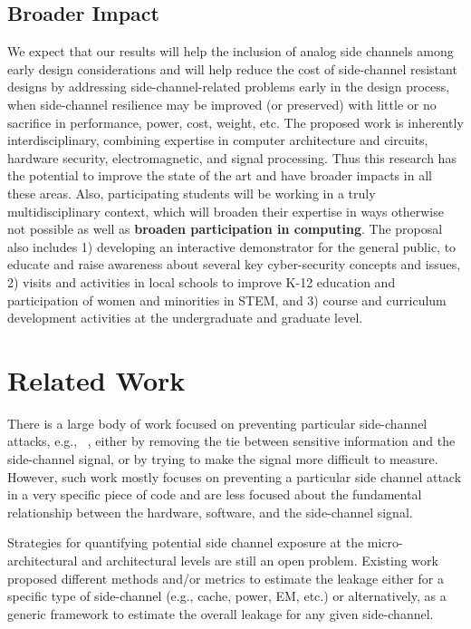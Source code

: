 \documentclass[11 pt]{article}
\begin{document}
\subsection{Broader Impact}
We expect that our results will help the inclusion of analog side channels among early design considerations and will help reduce the cost of side-channel resistant designs by addressing side-channel-related problems early in the design process, when side-channel resilience may be improved (or preserved) with little or no sacrifice in performance, power, cost, weight, etc. The proposed work is inherently interdisciplinary, combining expertise in computer architecture and circuits, hardware security, electromagnetic, and signal processing. Thus this research has the potential to improve the state of the art and have broader impacts in all these areas. Also, participating students will be working in a truly multidisciplinary context, which will broaden their expertise in ways otherwise not possible as well as {\bf broaden participation in computing}. The proposal also includes 1) developing an interactive demonstrator for the general public, to educate and raise awareness about several key cyber-security concepts and issues, 2) visits and activities in local schools to improve K-12 education and participation of women and minorities in STEM, and 3) course and curriculum development activities at the undergraduate and graduate level.
\section{Related Work}
There is a large body of work focused on preventing particular side-channel attacks, e.g., ~\cite{Backes:2010:ASA:1929820.1929847,Nazari:2017:EED:3079856.3080223,Demme:2013:FOM:2485922.2485970,Han:2017:WMB:3133956.3134081,Liu:2016:CET:2976749.2978299,6987331,He:2017:SYC:3123939.3124546,217605,Monjur21}, either by removing the tie between sensitive information and the side-channel signal, or by
trying to make the signal more difficult to measure. However, such work mostly focuses on preventing a particular side
channel attack in a very specific piece of code and are less focused about the fundamental relationship between the hardware, software, and the side-channel signal.

Strategies for quantifying potential side channel exposure at the micro-architectural and architectural levels are still
an open problem. Existing work proposed different methods and/or metrics to estimate the leakage either for a specific type of side-channel (e.g., cache, power, EM, etc.) or alternatively, as a generic framework to estimate the overall leakage for any given side-channel.
\end{document}
